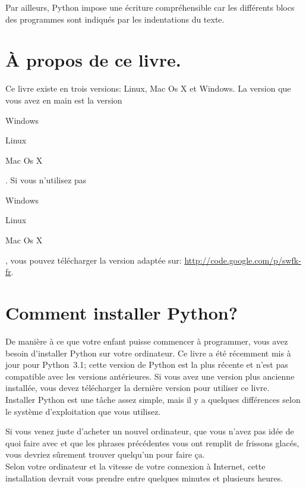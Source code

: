 Par ailleurs, Python impose une écriture compréhensible car les différents blocs des programmes sont indiqués par les indentations du texte.

\section*{À propos de ce livre.}

Ce livre existe en trois versions: Linux, Mac Os X et Windows. La version que vous avez en main est la version  \begin{WINDOWS}Windows\end{WINDOWS}\begin{LINUX}Linux\end{LINUX}\begin{MAC}Mac Os X\end{MAC}. Si vous n'utilisez pas \begin{WINDOWS}Windows\end{WINDOWS}\begin{LINUX}Linux\end{LINUX}\begin{MAC}Mac Os X\end{MAC}, vous pouvez télécharger la version adaptée sur: \url{http://code.google.com/p/swfk-fr}.
\\
\bigskip
\section*{Comment installer Python?}
De manière à ce que votre enfant puisse commencer à programmer, vous avez besoin d'installer Python sur votre ordinateur. Ce livre a été récemment mis à jour pour Python~3.1; cette version de Python est la plus récente et n'est pas compatible avec les versions antérieures. Si vous avez une version plus ancienne installée, vous devez télécharger la dernière version pour utiliser ce livre.
\\


Installer Python est une tâche assez simple, mais il y a quelques différences selon le système d'exploitation que vous utilisez. 




Si vous venez juste d'acheter un nouvel ordinateur, que vous n'avez pas idée de quoi faire avec et que les phrases précédentes vous ont remplit de frissons glacés, vous devriez sûrement trouver quelqu'un pour faire ça.\\


Selon votre ordinateur et la vitesse de votre connexion à Internet, cette installation devrait vous prendre entre quelques minutes et plusieurs heures.

